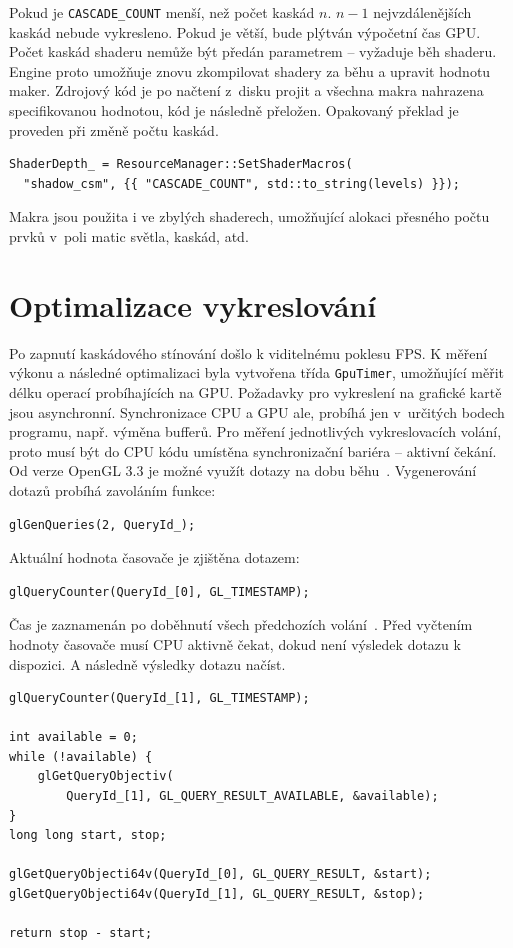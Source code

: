 \documentclass[thesis=M,czech]{FITthesis}[2019/12/23]
\begin{document}
Pokud je \texttt{CASCADE\_COUNT} menší, než počet kaskád $n$. $n - 1$ nejvzdálenějších kaskád nebude vykresleno. Pokud je větší, bude plýtván výpočetní čas GPU. Počet kaskád shaderu nemůže být předán parametrem -- vyžaduje běh shaderu. Engine proto umožňuje znovu zkompilovat shadery za běhu a upravit hodnotu maker. Zdrojový kód je po načtení z~disku projit a všechna makra nahrazena specifikovanou hodnotou, kód je následně přeložen. Opakovaný překlad je proveden při změně počtu kaskád.

\begin{verbatim}
ShaderDepth_ = ResourceManager::SetShaderMacros(
  "shadow_csm", {{ "CASCADE_COUNT", std::to_string(levels) }});
\end{verbatim}

Makra jsou použita i ve zbylých shaderech, umožňující alokaci přesného počtu prvků v~poli matic světla, kaskád, atd.

\section{Optimalizace vykreslování}

Po zapnutí kaskádového stínování došlo k viditelnému poklesu FPS. K měření výkonu a následné optimalizaci byla vytvořena třída \texttt{GpuTimer}, umožňující měřit délku operací probíhajících na GPU. Požadavky pro vykreslení na grafické kartě jsou asynchronní. Synchronizace CPU a GPU ale, probíhá jen v~určitých bodech programu, např. výměna bufferů. Pro měření jednotlivých vykreslovacích volání, proto musí být do CPU kódu umístěna synchronizační bariéra -- aktivní čekání. Od verze OpenGL 3.3 je možné využít dotazy na dobu běhu~\cite{timer}. Vygenerování dotazů probíhá zavoláním funkce: 

\begin{verbatim}
glGenQueries(2, QueryId_);
\end{verbatim}

Aktuální hodnota časovače je zjištěna dotazem:

\begin{verbatim}
glQueryCounter(QueryId_[0], GL_TIMESTAMP);
\end{verbatim}

Čas je zaznamenán po doběhnutí všech předchozích volání~\cite{kronos_counter}. Před vy\-čte\-ním hodnoty časovače musí CPU aktivně čekat, dokud není výsledek dotazu k dispozici. A následně výsledky dotazu načíst.

\begin{verbatim}
glQueryCounter(QueryId_[1], GL_TIMESTAMP);

int available = 0;
while (!available) {
    glGetQueryObjectiv(
        QueryId_[1], GL_QUERY_RESULT_AVAILABLE, &available);
}
long long start, stop;

glGetQueryObjecti64v(QueryId_[0], GL_QUERY_RESULT, &start);
glGetQueryObjecti64v(QueryId_[1], GL_QUERY_RESULT, &stop);

return stop - start;
\end{verbatim}
\end{document}
